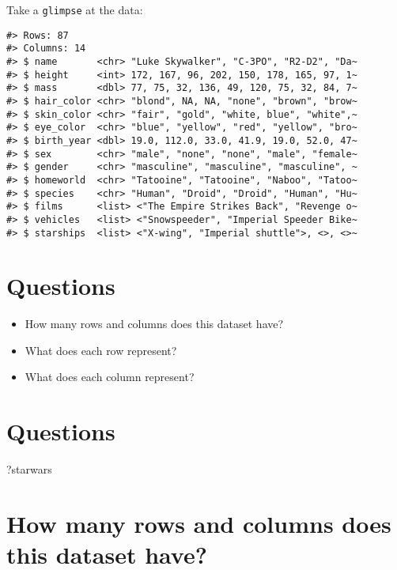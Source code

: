 \documentclass[
]{book}
\newenvironment{Shaded}{\begin{snugshade}}{\end{snugshade}}
\newcommand{\NormalTok}[1]{#1}
\providecommand{\tightlist}{%
  \setlength{\itemsep}{0pt}\setlength{\parskip}{0pt}}
\theoremstyle{definition}
\theoremstyle{definition}
\theoremstyle{definition}
\theoremstyle{definition}
\theoremstyle{remark}
\begin{document}
Take a \texttt{glimpse} at the data:

\begin{verbatim}
#> Rows: 87
#> Columns: 14
#> $ name       <chr> "Luke Skywalker", "C-3PO", "R2-D2", "Da~
#> $ height     <int> 172, 167, 96, 202, 150, 178, 165, 97, 1~
#> $ mass       <dbl> 77, 75, 32, 136, 49, 120, 75, 32, 84, 7~
#> $ hair_color <chr> "blond", NA, NA, "none", "brown", "brow~
#> $ skin_color <chr> "fair", "gold", "white, blue", "white",~
#> $ eye_color  <chr> "blue", "yellow", "red", "yellow", "bro~
#> $ birth_year <dbl> 19.0, 112.0, 33.0, 41.9, 19.0, 52.0, 47~
#> $ sex        <chr> "male", "none", "none", "male", "female~
#> $ gender     <chr> "masculine", "masculine", "masculine", ~
#> $ homeworld  <chr> "Tatooine", "Tatooine", "Naboo", "Tatoo~
#> $ species    <chr> "Human", "Droid", "Droid", "Human", "Hu~
#> $ films      <list> <"The Empire Strikes Back", "Revenge o~
#> $ vehicles   <list> <"Snowspeeder", "Imperial Speeder Bike~
#> $ starships  <list> <"X-wing", "Imperial shuttle">, <>, <>~
\end{verbatim}

\hypertarget{questions}{%
\section{Questions}\label{questions}}

\begin{itemize}
\tightlist
\item
  How many rows and columns does this dataset have?
\item
  What does each row represent?
\item
  What does each column represent?
\end{itemize}

\hypertarget{questions-1}{%
\section{Questions}\label{questions-1}}

\begin{Shaded}
\begin{Highlighting}[]
\NormalTok{?starwars}
\end{Highlighting}
\end{Shaded}

\hypertarget{how-many-rows-and-columns-does-this-dataset-have}{%
\section{How many rows and columns does this dataset have?}\label{how-many-rows-and-columns-does-this-dataset-have}}
\end{document}
